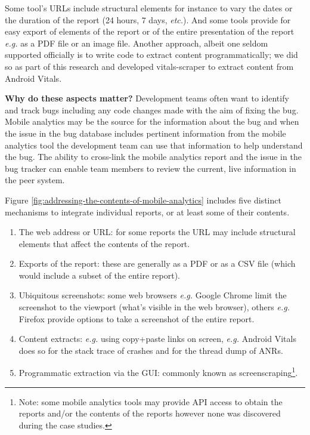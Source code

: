 Some tool's URLs include structural elements for instance to vary the dates or the duration of the report (24 hours, 7 days, \emph{etc.}). And some tools provide for easy export of elements of the report or of the entire presentation of the report \emph{e.g.} as a PDF file or an image file. Another approach, albeit one seldom supported officially is to write code to extract content programmatically; we did so as part of this research and developed vitals-scraper to extract content from Android Vitals. 

\textbf{Why do these aspects matter?} 
Development teams often want to identify and track bugs including any code changes made with the aim of fixing the bug. Mobile analytics may be the source for the information about the bug and when the issue in the bug database includes pertinent information from the mobile analytics tool the development team can use that information to help understand the bug. The ability to cross-link the mobile analytics report and the issue in the bug tracker can enable team members to review the current, live information in the peer system. 

Figure \ref{fig:addressing-the-contents-of-mobile-analytics} includes five distinct mechanisms to integrate individual reports, or at least some of their contents.
\begin{enumerate}
    \itemsep0em
    \item The web address or URL: for some reports the URL may include structural elements that affect the contents of the report.
    \item Exports of the report: these are generally as a PDF or as a CSV file (which would include a subset of the entire report).
    \item Ubiquitous screenshots: some web browsers \emph{e.g.} Google Chrome limit the screenshot to the viewport (what's visible in the web browser), others \emph{e.g.} Firefox provide options to take a screenshot of the entire report.
    \item Content extracts: \emph{e.g.} using copy+paste links on screen, \emph{e.g.} Android Vitals does so for the stack trace of crashes and for the thread dump of ANRs.
    \item Programmatic extraction via the GUI: commonly known as screenscraping\footnote{Note: some mobile analytics tools may provide API access to obtain the reports and/or the contents of the reports however none was discovered during the case studies.}. 
\end{enumerate}

